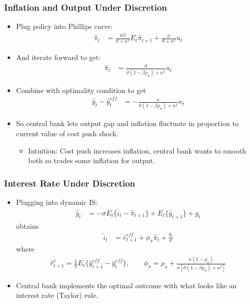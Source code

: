 \documentclass[11pt,aspectratio=169,xcolor={dvipsnames},hyperref={pdftex,pdfpagemode=UseNone,hidelinks,pdfdisplaydoctitle=true},usepdftitle=false]{beamer}
\begin{document}
\begin{frame}
\frametitle{Inflation and Output Under Discretion}
\begin{itemize}
	\item Plug policy into Phillips curve:
	\begin{align*}
		\hat{\pi}_t &=\frac{\vartheta\beta}{\vartheta+\kappa^2}E_t\hat{\pi}_{t+1}+\frac{\vartheta}{\vartheta+\kappa^2}u_t
	\end{align*}
	\item  And iterate forward to get:
	\begin{align*}
		\hat{\pi}_t &=\frac{\vartheta}{\vartheta(1-\beta\rho_u)+\kappa^2}u_t
	\end{align*}
	\item Combine with optimality condition to get
	\begin{align*}
		\hat{y}_{t} - \hat{y}_{t}^{eff} &=-\frac{\kappa}{\vartheta(1-\beta\rho_u)+\kappa^2}u_t
	\end{align*}
	\item So central bank lets output gap and inflation fluctuate in proportion to current value of cost push shock.
	\begin{itemize}
		\item Intuition: Cost push increases inflation, central bank wants to smooth both so trades some inflation for output.
	\end{itemize}
\end{itemize}
\end{frame}

\begin{frame}
\frametitle{Interest Rate Under Discretion}
\begin{itemize}
	\item Plugging into dynamic IS:
	\begin{align*}
		\hat{y}_t &=-\sigma E_t\{\hat{i}_t-\hat{\pi}_{t+1}\}+E_t\{\hat{y}_{t+1}\} + g_t
	\end{align*}
	obtains
	\begin{align*}
		\hat{i}_t &=\hat{r}_{t+1}^{eff}+\phi_\pi \hat{\pi}_{t}+\frac{g_t}{\sigma}
	\end{align*}
	where
	\begin{align*}
		 \hat{r}_{t+1}^e = \frac{1}{\sigma}E_t\{\hat{y}_{t+1}^{eff} - \hat{y}_t^{eff}\},\qquad \phi_\pi=\rho_u+\frac{\kappa(1-\rho_u)}{\sigma[\vartheta(1-\beta\rho_u)+\kappa^2]}
	\end{align*}
	\item Central bank implements the optimal outcome with what looks like an interest rate (Taylor) rule.
\end{itemize}
\end{frame}
\end{document}
